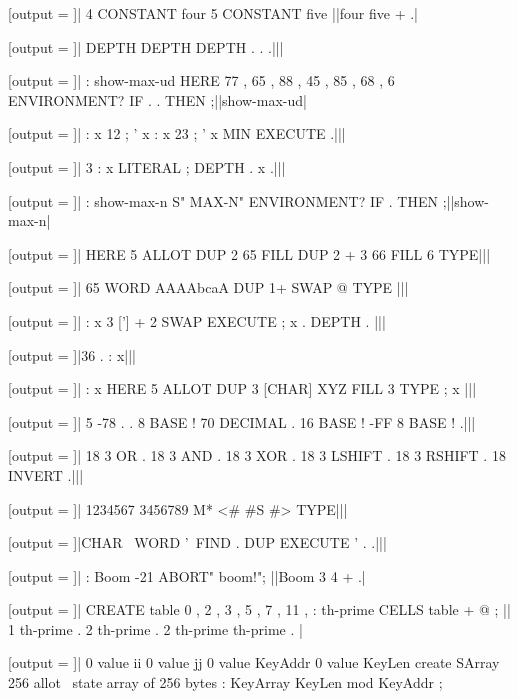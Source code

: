 [output = \result]|
  4 CONSTANT four
  5 CONSTANT five
||four five + .|
\typeout{\result}

[output = \result]|
  DEPTH DEPTH DEPTH . . .|||
\typeout{\result}

[output = \result]|
  : show-max-ud HERE 77 , 65 , 88 , 45 , 85 , 68 ,
    6 ENVIRONMENT? IF . . THEN ;||show-max-ud|
\typeout{\result}

[output = \result]|
  : x 12 ; ' x
  : x 23 ; ' x
  MIN EXECUTE .|||
\typeout{\result}

[output = \result]|
  3 : x LITERAL ; DEPTH . x .|||
\typeout{\result}

[output = \result]|
  : show-max-n S" MAX-N" ENVIRONMENT? IF . THEN ;||show-max-n|
\typeout{\result}

[output = \result]|
  HERE 5 ALLOT
  DUP 2 65 FILL
  DUP 2 + 3 66 FILL
  6 TYPE|||
\typeout{\result}

[output = \result]|
  65 WORD AAAAbcaA DUP 1+ SWAP @ TYPE
|||
\typeout{\result}

[output = \result]|
  : x 3 ['] + 2 SWAP EXECUTE ; x . DEPTH .
|||
\typeout{\result}

[output = \result]|36 . : x|||
\typeout{\result}

[output = \result]|
  : x HERE 5 ALLOT DUP 3 [CHAR] XYZ FILL 3 TYPE ; x |||
\typeout{\result}

[output = \result]|
  5 -78 . .
  8 BASE ! 70 DECIMAL .
  16 BASE ! -FF 8 BASE ! .|||
\typeout{\result}

[output = \result]|
  18 3 OR .
  18 3 AND .
  18 3 XOR .
  18 3 LSHIFT .
  18 3 RSHIFT .
  18 INVERT .|||
\typeout{\result}

[output = \result]|
  1234567 3456789 M* <# #S #> TYPE|||
\typeout{\result}

[output = \result]|CHAR \ WORD '\ FIND . DUP EXECUTE ' . .|||
\typeout{\result}

[output = \result]|
  : Boom -21 ABORT" boom!";
||Boom 3 4 + .|
\typeout{\result}

[output = \result]|
  CREATE table 0 , 2 , 3 , 5 , 7 , 11 ,
  : th-prime CELLS table + @ ;
||
  1 th-prime .
  2 th-prime .
  2 th-prime th-prime .
|
\typeout{\result}

\stop

[output = \result]|
  0 value ii        0 value jj
  0 value KeyAddr   0 value KeyLen
  create SArray   256 allot   \ state array of 256 bytes
  : KeyArray      KeyLen mod   KeyAddr ;

